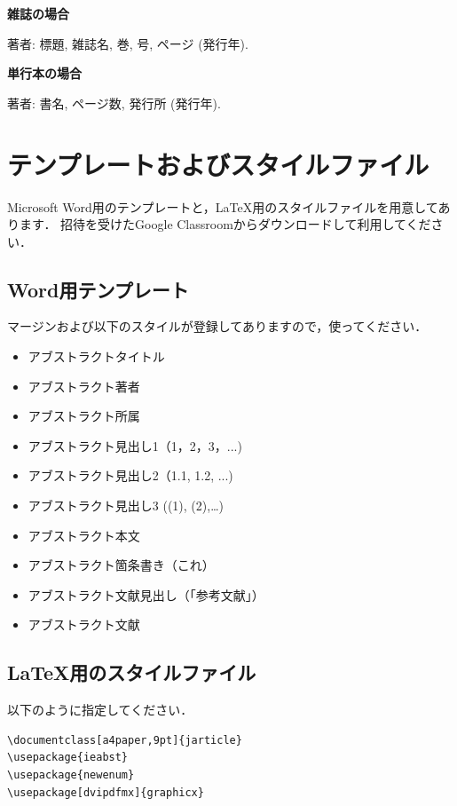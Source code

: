 \documentclass[a4paper, 9pt]{jarticle}
\begin{document}
\begin{論文概要}
\begin{newenumerate}

\item {\bf 雑誌の場合}

著者: 標題, 雑誌名, 巻, 号, ページ (発行年).

\item {\bf 単行本の場合}

著者: 書名, ページ数, 発行所 (発行年).

\end{newenumerate}

\section{テンプレートおよびスタイルファイル}
Microsoft Word用のテンプレートと，\LaTeX 用のスタイルファイルを用意してあります．
招待を受けたGoogle Classroomからダウンロードして利用してください．

\subsection{Word用テンプレート}
マージンおよび以下のスタイルが登録してありますので，使ってください．
\begin{itemize}
\item アブストラクトタイトル
\item アブストラクト著者
\item アブストラクト所属
\item アブストラクト見出し1（1，2，3，...)
\item アブストラクト見出し2（1.1, 1.2, ...)
\item アブストラクト見出し3 ((1), (2),…)
\item アブストラクト本文
\item アブストラクト箇条書き（これ）
\item アブストラクト文献見出し（「参考文献」）
\item アブストラクト文献
\end{itemize}

\subsection{\LaTeX 用のスタイルファイル}
以下のように指定してください．

\begin{verbatim}
\documentclass[a4paper,9pt]{jarticle}
\usepackage{ieabst}
\usepackage{newenum}
\usepackage[dvipdfmx]{graphicx}
\end{verbatim}


\end{論文概要}
\end{document}
